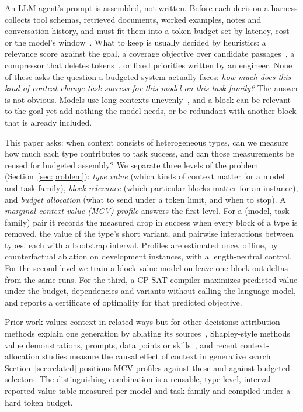 An LLM agent's prompt is assembled, not written. Before each decision a harness collects tool schemas, retrieved
documents, worked examples, notes and conversation history, and must fit them into a token budget set by latency, cost or
the model's window~\cite{cesurvey2025}. What to keep is usually decided by heuristics: a relevance score against the
goal, a coverage objective over candidate passages~\cite{pacms2026}, a compressor that deletes tokens~\cite{llmlingua2_2024},
or fixed priorities written by an engineer. None of these asks the question a budgeted system actually faces:
\emph{how much does this kind of context change task success for this model on this task family?} The answer is not
obvious. Models use long contexts unevenly~\cite{lostmiddle2024}, and a block can be relevant to the goal yet add
nothing the model needs, or be redundant with another block that is already included.

This paper asks: when context consists of heterogeneous types, can we measure how much each type contributes to task
success, and can those measurements be reused for budgeted assembly? We separate three levels of the problem
(Section~\ref{sec:problem}): \emph{type value} (which kinds of context matter for a model and task family),
\emph{block relevance} (which particular blocks matter for an instance), and \emph{budget allocation} (what to send under a
token limit, and when to stop). A \emph{marginal context value (MCV) profile} answers the first level. For a (model, task
family) pair it records the measured drop in success when every block of a type is removed, the value of the type's
short variant, and pairwise interactions between types, each with a bootstrap interval. Profiles are estimated once,
offline, by counterfactual ablation on development instances, with a length-neutral control. For the second level we
train a block-value model on leave-one-block-out deltas from the same runs. For the third, a CP-SAT compiler maximizes
predicted value under the budget, dependencies and variants without calling the language model, and reports a
certificate of optimality for that predicted objective.

Prior work values context in related ways but for other decisions: attribution methods explain one generation by
ablating its sources~\cite{contextcite2024,attribot2024}, Shapley-style methods value demonstrations, prompts, data
points or skills~\cite{demoshapley2024,promptshapley2023,datashapley2019,skillsv2026}, and recent context-allocation
studies measure the causal effect of context in generative search~\cite{ctxalloc2026}. Section~\ref{sec:related}
positions MCV profiles against these and against budgeted selectors. The distinguishing combination is a reusable,
type-level, interval-reported value table measured per model and task family and compiled under a hard token budget.

